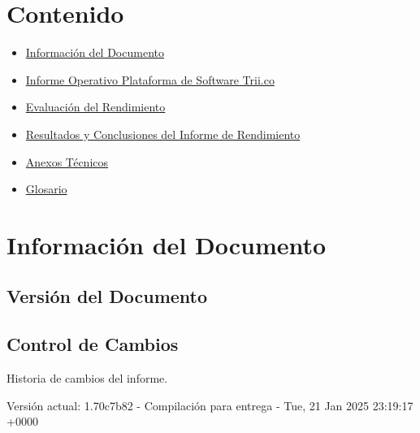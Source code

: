 \documentclass[
  paper=a4,
  ,captions=tableheading
]{scrartcl}
\providecommand{\tightlist}{%
  \setlength{\itemsep}{0pt}\setlength{\parskip}{0pt}}
\renewenvironment{quote}{\begin{customblockquote}\list{}{\rightmargin=0em\leftmargin=0em}%
\item\relax\color{blockquote-text}\ignorespaces}{\unskip\unskip\endlist\end{customblockquote}}
\begin{document}



\section{Contenido}\label{sec:contenido}

\begin{itemize}
\tightlist
\item
  \hyperref[informaciuxf3n-del-documento]{Información del Documento}
\item
  \hyperref[informe-operativo-plataforma-de-software-trii.co]{Informe
  Operativo Plataforma de Software Trii.co}
\item
  \hyperref[evaluaciuxf3n-del-rendimiento]{Evaluación del Rendimiento}
\item
  \hyperref[resultados-y-conclusiones-del-informe-de-rendimiento]{Resultados
  y Conclusiones del Informe de Rendimiento}
\item
  \hyperref[anexos-tuxe9cnicos]{Anexos Técnicos}
\item
  \hyperref[glosario]{Glosario}
\end{itemize}

\newpage

\section{Información del
Documento}\label{sec:informaciuxf3n-del-documento}

\subsection{Versión del Documento}\label{sec:versiuxf3n-del-documento}

\begin{quote}
\end{quote}

\subsection{Control de Cambios}\label{sec:control-de-cambios}

Historia de cambios del informe.

Versión actual: 1.70c7b82 - Compilación para entrega - Tue, 21 Jan 2025
23:19:17 +0000
\end{document}
